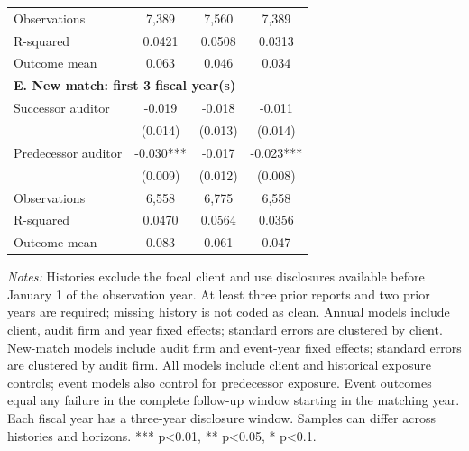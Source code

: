 \documentclass[10pt]{article}
\begin{document}
\begin{minipage}{19cm}
\begin{threeparttable}
\begin{tabular}{p{}ccc}
Observations & 7,389 & 7,560 & 7,389 \\
R-squared & 0.0421 & 0.0508 & 0.0313 \\
Outcome mean & 0.063 & 0.046 & 0.034 \\
\multicolumn{4}{l}{\textbf{E. New match: first 3 fiscal year(s)}} \\
Successor auditor & -0.019 & -0.018 & -0.011 \\
 & (0.014) & (0.013) & (0.014) \\
Predecessor auditor & -0.030*** & -0.017 & -0.023*** \\
 & (0.009) & (0.012) & (0.008) \\
Observations & 6,558 & 6,775 & 6,558 \\
R-squared & 0.0470 & 0.0564 & 0.0356 \\
Outcome mean & 0.083 & 0.061 & 0.047 \\
\bottomrule
\end{tabular}
\begin{tablenotes}\fontsize{9}{11}\selectfont
\item \raggedright \fontsize{9}{11}\selectfont \textit{Notes:} Histories exclude the focal client and use disclosures available before January 1 of the observation year. At least three prior reports and two prior years are required; missing history is not coded as clean. Annual models include client, audit firm and year fixed effects; standard errors are clustered by client. New-match models include audit firm and event-year fixed effects; standard errors are clustered by audit firm. All models include client and historical exposure controls; event models also control for predecessor exposure. Event outcomes equal any failure in the complete follow-up window starting in the matching year. Each fiscal year has a three-year disclosure window. Samples can differ across histories and horizons. *** p<0.01, ** p<0.05, * p<0.1.
\end{tablenotes}
\end{threeparttable}

\end{minipage}
\end{document}
